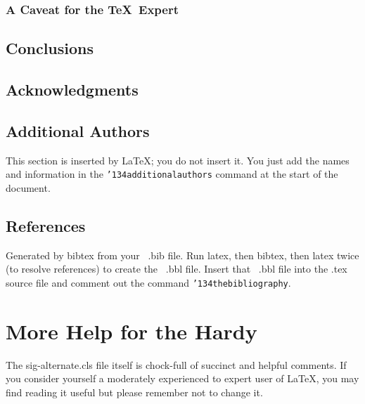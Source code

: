 \documentclass{sig-alternate}
\begin{document}
\subsubsection*{A Caveat for the \TeX\ Expert}
\subsection{Conclusions}
\subsection{Acknowledgments}
\subsection{Additional Authors}
This section is inserted by \LaTeX; you do not insert it.
You just add the names and information in the
\texttt{{\char'134}additionalauthors} command at the start
of the document.
\subsection{References}
Generated by bibtex from your ~.bib file.  Run latex,
then bibtex, then latex twice (to resolve references)
to create the \cite{mur} ~.bbl file. \cite{roadalarm} Insert that ~.bbl file into
the .tex source file and comment out
the command \texttt{{\char'134}thebibliography}.
\section{More Help for the Hardy}
The sig-alternate.cls file itself is chock-full of succinct
and helpful comments.  If you consider yourself a moderately
experienced to expert user of \LaTeX, you may find reading
it useful but please remember not to change it.
\end{document}
